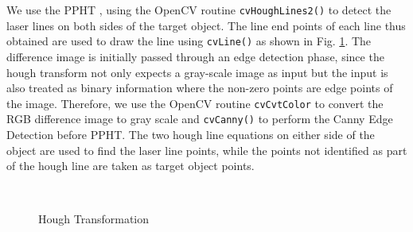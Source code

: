 We use the \ac{PPHT} \cite{kiryati:1991}, \cite{matas:2000} using the OpenCV
routine \texttt{cvHoughLines2()} to detect the laser lines on both sides of
the target object. The line end points of each line thus obtained are used to
draw the line using \texttt{cvLine()} as shown in Fig.
\ref{figure:hough-transform}.  The difference image is initially passed
through an edge detection phase, since the hough transform not only expects a
gray-scale image as input but the input is also treated as binary information
where the non-zero points are edge points of the image. Therefore, we use the
OpenCV routine \texttt{cvCvtColor} to convert the RGB difference image to gray
scale and \texttt{cvCanny()} to perform the Canny Edge Detection
\cite{canny:1986} before \ac{PPHT}. The two hough line equations on either
side of the object are used to find the laser line points, while the points
not identified as part of the hough line are taken as target object points.

\begin{figure}[ht!]
\centering
{} \quad
{} \\
\caption{Hough Transformation}
\label{figure:hough-transform}
\end{figure}
